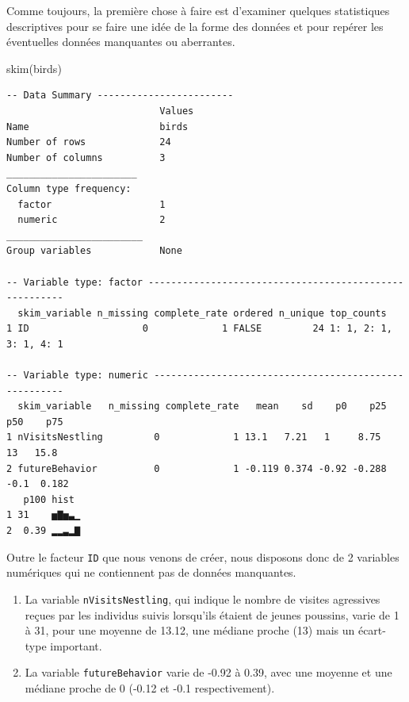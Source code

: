 \documentclass[
  a4paper,
]{article}
\newenvironment{Shaded}{\begin{snugshade}}{\end{snugshade}}
\newcommand{\FunctionTok}[1]{\textcolor[rgb]{0.39,0.29,0.61}{#1}}
\newcommand{\NormalTok}[1]{\textcolor[rgb]{0.12,0.11,0.11}{#1}}
\providecommand{\tightlist}{%
  \setlength{\itemsep}{0pt}\setlength{\parskip}{0pt}}
\begin{document}
Comme toujours, la première chose à faire est d'examiner quelques statistiques descriptives pour se faire une idée de la forme des données et pour repérer les éventuelles données manquantes ou aberrantes.

\begin{Shaded}
\begin{Highlighting}[]
\FunctionTok{skim}\NormalTok{(birds)}
\end{Highlighting}
\end{Shaded}

\begin{verbatim}
-- Data Summary ------------------------
                           Values
Name                       birds 
Number of rows             24    
Number of columns          3     
_______________________          
Column type frequency:           
  factor                   1     
  numeric                  2     
________________________         
Group variables            None  

-- Variable type: factor -------------------------------------------------------
  skim_variable n_missing complete_rate ordered n_unique top_counts            
1 ID                    0             1 FALSE         24 1: 1, 2: 1, 3: 1, 4: 1

-- Variable type: numeric ------------------------------------------------------
  skim_variable   n_missing complete_rate   mean    sd    p0    p25   p50    p75
1 nVisitsNestling         0             1 13.1   7.21   1     8.75   13   15.8  
2 futureBehavior          0             1 -0.119 0.374 -0.92 -0.288  -0.1  0.182
   p100 hist 
1 31    ▅▇▅▃▁
2  0.39 ▂▂▃▂▇
\end{verbatim}

Outre le facteur \texttt{ID} que nous venons de créer, nous disposons donc de 2 variables numériques qui ne contiennent pas de données manquantes.

\begin{enumerate}
\def\labelenumi{\arabic{enumi}.}
\tightlist
\item
  La variable \texttt{nVisitsNestling}, qui indique le nombre de visites agressives reçues par les individus suivis lorsqu'ils étaient de jeunes poussins, varie de 1 à 31, pour une moyenne de 13.12, une médiane proche (13) mais un écart-type important.
\item
  La variable \texttt{futureBehavior} varie de -0.92 à 0.39, avec une moyenne et une médiane proche de 0 (-0.12 et -0.1 respectivement).
\end{enumerate}
\end{document}
